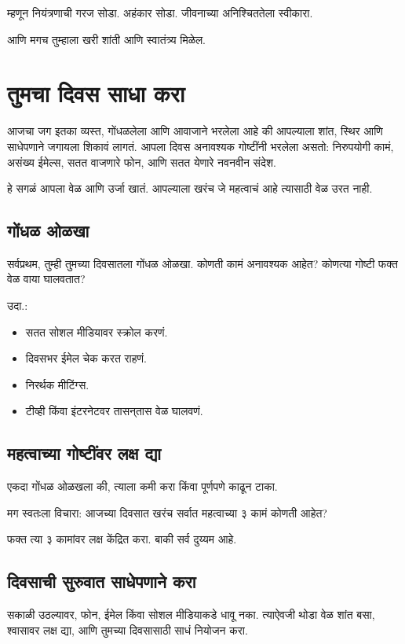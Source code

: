 म्हणून नियंत्रणाची गरज सोडा.  
अहंकार सोडा.  
जीवनाच्या अनिश्चिततेला स्वीकारा.  

आणि मगच तुम्हाला खरी शांती आणि स्वातंत्र्य मिळेल.  



\chapter{तुमचा दिवस साधा करा}

आजचा जग इतका व्यस्त, गोंधळलेला आणि आवाजाने भरलेला आहे की  
आपल्याला शांत, स्थिर आणि साधेपणाने जगायला शिकावं लागतं.  
आपला दिवस अनावश्यक गोष्टींनी भरलेला असतो:  
निरुपयोगी कामं, असंख्य ईमेल्स,  
सतत वाजणारे फोन,  
आणि सतत येणारे नवनवीन संदेश.  

हे सगळं आपला वेळ आणि उर्जा खातं.  
आपल्याला खरंच जे महत्वाचं आहे त्यासाठी वेळ उरत नाही.  

\section*{गोंधळ ओळखा}
सर्वप्रथम, तुम्ही तुमच्या दिवसातला गोंधळ ओळखा.  
कोणती कामं अनावश्यक आहेत?  
कोणत्या गोष्टी फक्त वेळ वाया घालवतात?  

उदा.:  
\begin{itemize}
\item सतत सोशल मीडियावर स्क्रोल करणं.  
\item दिवसभर ईमेल चेक करत राहणं.  
\item निरर्थक मीटिंग्स.  
\item टीव्ही किंवा इंटरनेटवर तासन्‌तास वेळ घालवणं.  
\end{itemize}

\section*{महत्वाच्या गोष्टींवर लक्ष द्या}
एकदा गोंधळ ओळखला की,  
त्याला कमी करा किंवा पूर्णपणे काढून टाका.  

मग स्वतःला विचारा:  
आजच्या दिवसात खरंच सर्वात महत्वाच्या ३ कामं कोणती आहेत?  

फक्त त्या ३ कामांवर लक्ष केंद्रित करा.  
बाकी सर्व दुय्यम आहे.  

\section*{दिवसाची सुरुवात साधेपणाने करा}
सकाळी उठल्यावर,  
फोन, ईमेल किंवा सोशल मीडियाकडे धावू नका.  
त्याऐवजी थोडा वेळ शांत बसा,  
श्वासावर लक्ष द्या,  
आणि तुमच्या दिवसासाठी साधं नियोजन करा.  

